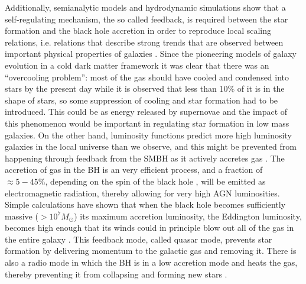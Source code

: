 Additionally, semianalytic models and hydrodynamic simulations show that a self-regulating mechanism, the so called feedback, is required between the star formation and the black hole accretion in order to reproduce local scaling relations, i.e. relations that describe strong trends that are observed between important physical properties of galaxies %
\citep[see][for a review]{2015ARA&A..53...51S}. Since the pioneering models of galaxy evolution in a cold dark matter framework it was clear that there was an ``overcooling problem'': most of the gas should have cooled and condensed into stars by the present day while it is observed that less than 10\% of it is in the shape of stars, so some suppression of cooling and star formation had to be introduced. This could be as energy released by supernovae \citep{1974MNRAS.169..229L,1978MNRAS.183..341W,1986ApJ...303...39D,1991ApJ...379...52W} and the impact of this phenomenon would be important in regulating star formation in low mass galaxies. On the other hand, luminosity functions predict more high luminosity galaxies in the local universe than we observe, and this might be prevented from happening through feedback from the SMBH as it actively accretes gas %
.%
The accretion of gas in the BH is an very efficient process, and a fraction of $\approx 5-45\%$, depending on the spin of the black hole \citep[e.g.][]{1963PhRvL..11..237K,1983bhwd.book.....S}, will be emitted as electromagnetic radiation, thereby allowing for very high AGN luminosities.
Simple calculations have shown that when the black hole becomes sufficiently massive ($> 10^7 M_\odot$) its maximum accretion luminosity, the Eddington %
luminosity, becomes high enough that its winds could in principle blow out all of the gas in the entire galaxy \citep{1998A&A...331L...1S}. This feedback mode, called quasar mode, prevents star formation by delivering momentum to the galactic gas and removing it. There is also a radio mode in which the BH is in a low accretion mode and heats the gas, thereby preventing it from collapsing and forming new stars \citep{2017NatAs...1E.165H}.
     
